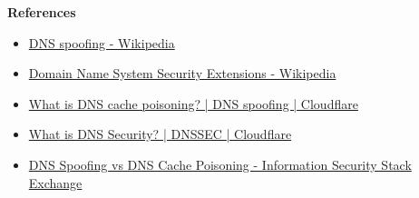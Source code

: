 \documentclass[12pt, a4paper]{article}
\begin{document}
  \textbf{References}
  \begin{itemize}
    \item \href{https://en.wikipedia.org/wiki/DNS_spoofing}{DNS spoofing - Wikipedia}
    \item \href{https://en.wikipedia.org/wiki/Domain_Name_System_Security_Extensions}{Domain Name System Security Extensions - Wikipedia}
    \item \href{https://www.cloudflare.com/learning/dns/dns-cache-poisoning/}{What is DNS cache poisoning? | DNS spoofing | Cloudflare}
    \item \href{https://www.cloudflare.com/learning/dns/dns-security/}{What is DNS Security? | DNSSEC | Cloudflare}
    \item \href{https://security.stackexchange.com/questions/33257/dns-spoofing-vs-dns-cache-poisoning}{DNS Spoofing vs DNS Cache Poisoning - Information Security Stack Exchange}
  \end{itemize}

  \pagebreak
\end{document}
